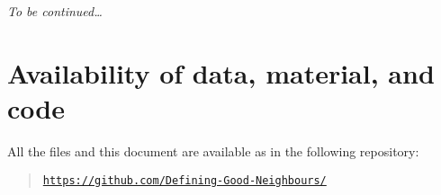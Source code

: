 \documentclass[a4paper,doc,11pt]{article}
\begin{document}
\emph{To be continued\ldots}





































\newpage

\section*{Availability of data, material, and code}
{

All the files and this document are available as in the following repository:
\begin{quote}
    \noindent \href{https://github.com/Defining-Good-Neighbours/}{\texttt{https://github.com/Defining-Good-Neighbours/}}
\end{quote}



}




\end{document}

